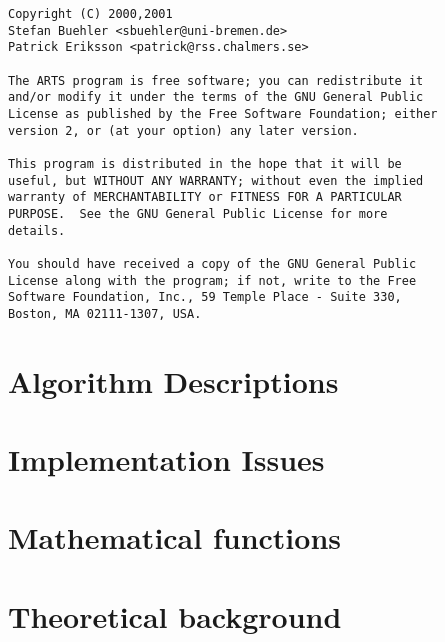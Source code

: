 \newpage                          
\thispagestyle{empty}
\vspace*{\fill}
\noindent
\begin{verbatim}
Copyright (C) 2000,2001 
Stefan Buehler <sbuehler@uni-bremen.de>
Patrick Eriksson <patrick@rss.chalmers.se>

The ARTS program is free software; you can redistribute it
and/or modify it under the terms of the GNU General Public
License as published by the Free Software Foundation; either
version 2, or (at your option) any later version.

This program is distributed in the hope that it will be
useful, but WITHOUT ANY WARRANTY; without even the implied
warranty of MERCHANTABILITY or FITNESS FOR A PARTICULAR
PURPOSE.  See the GNU General Public License for more
details. 

You should have received a copy of the GNU General Public
License along with the program; if not, write to the Free
Software Foundation, Inc., 59 Temple Place - Suite 330,
Boston, MA 02111-1307, USA. 
\end{verbatim}
\cleardoublepage

\tableofcontents

\cleardoublepage
{}
     

%
%



%
\part{Algorithm Descriptions}


%



%
%
%
% 
\part{Implementation Issues}


\part{Mathematical functions}



\part{Theoretical background}



%
%


